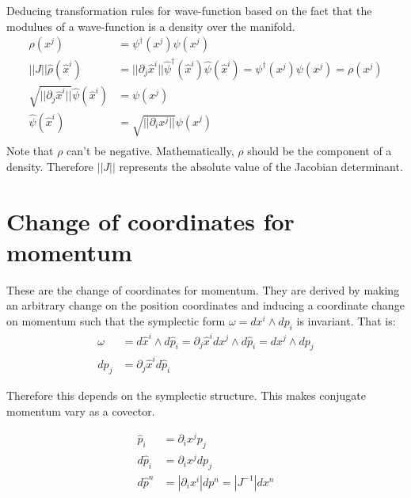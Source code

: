 \documentclass[11pt]{article}
\begin{document}
Deducing transformation rules for wave-function based on the fact that the modulues of a wave-function is a density over the manifold.
\begin{equation}
	\begin{aligned}
		\rho(x^j) &= \psi^\dagger(x^j) \psi(x^j)\\
		||J|| \hat{\rho}(\hat{x}^i) &= || \partial_j \hat{x}^i || \hat{\psi}^\dagger(\hat{x}^i) \hat{\psi}(\hat{x}^i) = \psi^\dagger(x^j) \psi(x^j) = \rho(x^j) \\
		\sqrt{|| \partial_j \hat{x}^i ||} \hat{\psi}(\hat{x}^i) &= \psi(x^j) \\
		\hat{\psi}(\hat{x}^i) &= \sqrt{|| \partial_i x^j ||} \psi(x^j) \\
	\end{aligned}
\end{equation}
Note that $\rho$ can't be negative. Mathematically,  $\rho$ should be the component of a density. Therefore $||J||$ represents the absolute value of the Jacobian determinant.

\section{Change of coordinates for momentum}

These are the change of coordinates for momentum. They are derived by making an arbitrary change on the position coordinates and inducing a coordinate change on momentum such that the symplectic form $\omega = dx^i \wedge dp_i$ is invariant. That is:
\begin{equation}
	\begin{aligned}
		\omega &= d\hat{x}^i \wedge d\hat{p}_i = \partial_j \hat{x}^i dx^j \wedge d\hat{p}_i = dx^j \wedge dp_j \\ 
		d p_j &= \partial_j \hat{x}^i d\hat{p}_i
	\end{aligned}
\end{equation}

Therefore this depends on the symplectic structure. This makes conjugate momentum vary as a covector.

\begin{equation}
	\begin{aligned}
		\hat{p}_i &= \partial_i x^j p_j \\
		d \hat{p}_i &= \partial_i x^j d p_j \\
		d\hat{p}^n &= | \partial_i x^i | dp^n = |J^{-1}| dx^n \\
	\end{aligned}
\end{equation}
\end{document}
